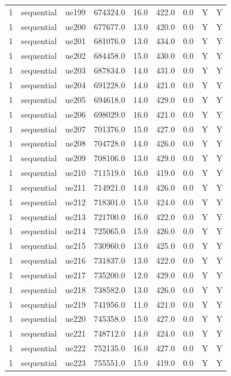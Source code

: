\begin{table}[ht]
\begin{tabular}{|c|c|c|c|c|c|c|c|c|}
1 & sequential & ue199 & 674324.0 & 16.0 & 422.0 & 0.0 & Y & Y \\
1 & sequential & ue200 & 677677.0 & 13.0 & 420.0 & 0.0 & Y & Y \\
1 & sequential & ue201 & 681076.0 & 13.0 & 434.0 & 0.0 & Y & Y \\
1 & sequential & ue202 & 684458.0 & 15.0 & 430.0 & 0.0 & Y & Y \\
1 & sequential & ue203 & 687834.0 & 14.0 & 431.0 & 0.0 & Y & Y \\
1 & sequential & ue204 & 691228.0 & 14.0 & 421.0 & 0.0 & Y & Y \\
1 & sequential & ue205 & 694618.0 & 14.0 & 429.0 & 0.0 & Y & Y \\
1 & sequential & ue206 & 698029.0 & 16.0 & 421.0 & 0.0 & Y & Y \\
1 & sequential & ue207 & 701376.0 & 15.0 & 427.0 & 0.0 & Y & Y \\
1 & sequential & ue208 & 704728.0 & 14.0 & 426.0 & 0.0 & Y & Y \\
1 & sequential & ue209 & 708106.0 & 13.0 & 429.0 & 0.0 & Y & Y \\
1 & sequential & ue210 & 711519.0 & 16.0 & 419.0 & 0.0 & Y & Y \\
1 & sequential & ue211 & 714921.0 & 14.0 & 426.0 & 0.0 & Y & Y \\
1 & sequential & ue212 & 718301.0 & 15.0 & 424.0 & 0.0 & Y & Y \\
1 & sequential & ue213 & 721700.0 & 16.0 & 422.0 & 0.0 & Y & Y \\
1 & sequential & ue214 & 725065.0 & 15.0 & 426.0 & 0.0 & Y & Y \\
1 & sequential & ue215 & 730960.0 & 13.0 & 425.0 & 0.0 & Y & Y \\
1 & sequential & ue216 & 731837.0 & 13.0 & 422.0 & 0.0 & Y & Y \\
1 & sequential & ue217 & 735200.0 & 12.0 & 429.0 & 0.0 & Y & Y \\
1 & sequential & ue218 & 738582.0 & 13.0 & 426.0 & 0.0 & Y & Y \\
1 & sequential & ue219 & 741956.0 & 11.0 & 421.0 & 0.0 & Y & Y \\
1 & sequential & ue220 & 745358.0 & 15.0 & 427.0 & 0.0 & Y & Y \\
1 & sequential & ue221 & 748712.0 & 14.0 & 424.0 & 0.0 & Y & Y \\
1 & sequential & ue222 & 752135.0 & 16.0 & 427.0 & 0.0 & Y & Y \\
1 & sequential & ue223 & 755551.0 & 15.0 & 419.0 & 0.0 & Y & Y \\

\end{tabular}
\end{table}
